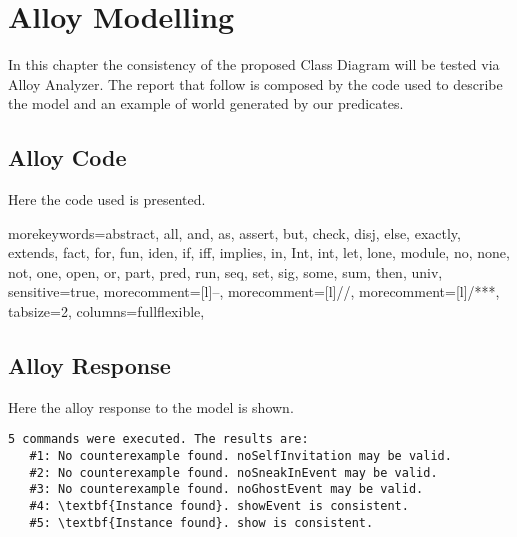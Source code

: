 \chapter{Alloy Modelling}
\label{alloy}

In this chapter the consistency of the proposed Class Diagram will be tested via Alloy Analyzer. The report that follow is composed by the code used to describe the model and an example of world generated by our predicates.

\section{Alloy Code}
Here the code used is presented.

{morekeywords={abstract, all, and, as, assert, but, check, disj, else,
  exactly, extends, fact, for, fun, iden, if, iff, implies, in, Int,
  int, let, lone, module, no, none, not, one, open, or, part, pred,
  run, seq, set, sig, some, sum, then, univ},
sensitive=true,
morecomment=[l]{--},
morecomment=[l]{//},
morecomment=[l]{/***},
tabsize=2,
columns=fullflexible,
}


\lstset{escapechar=@,style = customc}






\section{Alloy Response}
Here the alloy response to the model is shown.
\begin{Verbatim}[commandchars=\\\{\},codes={\catcode`$=3\catcode`_=8}]
5 commands were executed. The results are:
   #1: No counterexample found. noSelfInvitation may be valid.
   #2: No counterexample found. noSneakInEvent may be valid.
   #3: No counterexample found. noGhostEvent may be valid.
   #4: \textbf{Instance found}. showEvent is consistent.
   #5: \textbf{Instance found}. show is consistent.
\end{Verbatim}

